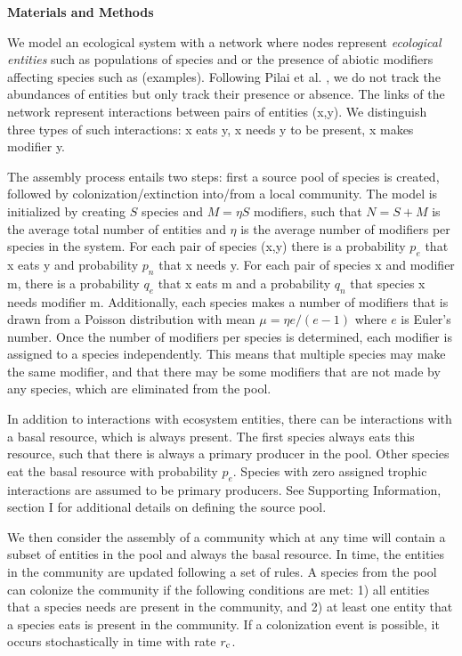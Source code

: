 \documentclass[twocolumn,preprintnumbers,amsmath,amssymb,superscriptaddress]{revtex4}
\newcommand{\rr}[1]{{\rm #1}}
\begin{document}
\vspace{-2mm}
\noindent \textbf{Materials and Methods}\\
  \footnotesize{
  We model an ecological system with a network where nodes represent \emph{ecological entities} such as populations of species and or the presence of abiotic modifiers affecting species such as (examples).
  Following Pilai et al. \cite{Pillai2011}, we do not track the abundances of entities but only track their presence or absence.
  The links of the network represent interactions between pairs of entities (x,y).
  We distinguish three types of such interactions: x eats y, x needs y to be present, x makes modifier y.

  The assembly process entails two steps: first a source pool of species is created, followed by colonization/extinction into/from a local community.
  The model is initialized by creating $S$ species and $M = \eta S$ modifiers, such that $N=S+M$ is the average total number of entities and $\eta$ is the average number of modifiers per species in the system.
  For each pair of species (x,y) there is a probability $p_e$ that x eats y and probability $p_n$ that x needs y.
  For each pair of species x and modifier m, there is a probability $q_e$ that x eats m and a probability $q_n$ that species x needs modifier m.
  Additionally, each species makes a number of modifiers that is drawn from a Poisson distribution with mean $\mu = \eta e/(e-1)$ where $e$ is Euler's number.
  Once the number of modifiers per species is determined, each modifier is assigned to a species independently.
  This means that multiple species may make the same modifier, and that there may be some modifiers that are not made by any species, which are eliminated from the pool.

  In addition to interactions with ecosystem entities, there can be interactions with a basal resource, which is always present.
  The first species always eats this resource, such that there is always a primary producer in the pool.
  Other species eat the basal resource with probability $p_e$.
  Species with zero assigned trophic interactions are assumed to be primary producers.
  See Supporting Information, section I for additional details on defining the source pool.

  We then consider the assembly of a community which at any time will contain a subset of entities in the pool and always the basal resource.
  In time, the entities in the community are updated following a set of rules.
  A species from the pool can colonize the community if the following conditions are met:
  1) all entities that a species needs are present in the community, and
  2) at least one entity that a species eats is present in the community.
  If a colonization event is possible, it occurs stochastically in time with rate $r_\rr{c}$.

}
\end{document}

